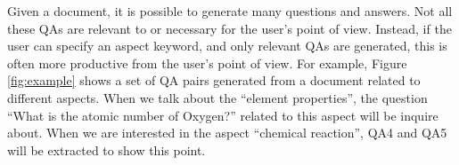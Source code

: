 Given a document, it is possible to generate many questions and answers.
Not all these QAs are relevant to or necessary for the user's point of view. 
Instead, if the user can specify an aspect keyword, and only relevant
QAs are generated, this is often more productive from the user's point of
view.
For example, Figure \ref{fig:example} shows a set of QA pairs generated from a document related to different aspects. 
When we talk about the ``element properties'', the question ``What is the atomic number of Oxygen?'' related to this aspect will be inquire about.
When we are interested in the aspect ``chemical reaction'', QA4 and QA5 will be extracted to show this point.

